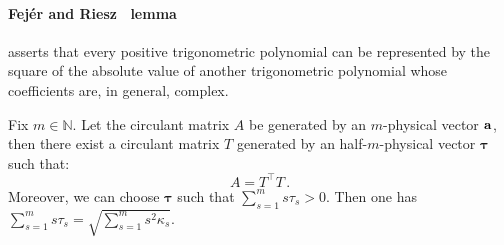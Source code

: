 {\paragraph{Fej\'er and Riesz~\cite[pg.~117 f]{RieSzo55} lemma}
\label{Lemma:FejerRiesz}
asserts that every positive
trigonometric polynomial can be represented by the square of the absolute
value of another trigonometric polynomial whose coefficients are, in
general, complex.
\bigskip

Fix $m \in {\mathbb N}$. Let the circulant matrix $A$ be generated by an
$m$-physical vector ${\bf{a}}$, then there exist a circulant matrix $T$
generated by an half-$m$-physical vector ${\boldsymbol{\tau}}$ such that:
	\begin{equation}
	\label{GKMM21:eq:T}
		A = T^\intercal T\,.
	\end{equation}
Moreover, we can choose ${\boldsymbol{\tau}}$ such that $\sum_{s=1}^m s
\tau_s > 0$. Then one has $\sum_{s=1}^m s
\tau_s=\sqrt{\sum_{s=1}^ms^2\kappa_s}$.

}
